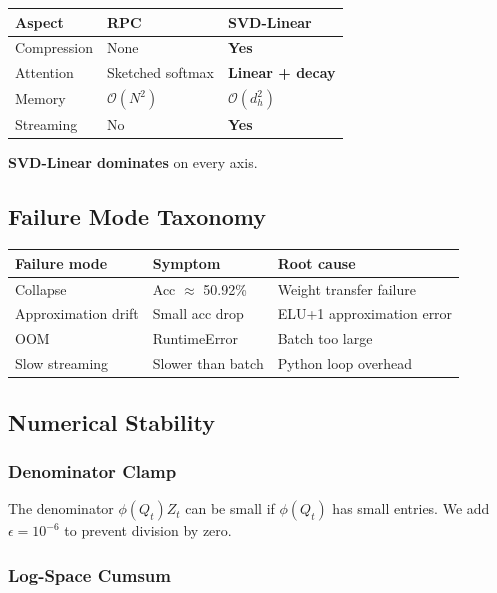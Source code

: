 \begin{table}[H]
\centering
\small
\begin{tabular}{lll}
\toprule
\textbf{Aspect} & \textbf{RPC} & \textbf{SVD-Linear} \\
\midrule
Compression & None & \textbf{Yes} \\
Attention & Sketched softmax & \textbf{Linear + decay} \\
Memory & $\mathcal{O}(N^2)$ & \textbf{$\mathcal{O}(d_h^2)$} \\
Streaming & No & \textbf{Yes} \\
\bottomrule
\end{tabular}
\end{table}

\textbf{SVD-Linear dominates} on every axis.

\subsection{Failure Mode Taxonomy}

\begin{table}[H]
\centering
\small
\begin{tabular}{lll}
\toprule
\textbf{Failure mode} & \textbf{Symptom} & \textbf{Root cause} \\
\midrule
Collapse & Acc $\approx$ 50.92\% & Weight transfer failure \\
Approximation drift & Small acc drop & ELU+1 approximation error \\
OOM & RuntimeError & Batch too large \\
Slow streaming & Slower than batch & Python loop overhead \\
\bottomrule
\end{tabular}
\end{table}

\subsection{Numerical Stability}

\subsubsection{Denominator Clamp}

The denominator $\phi(Q_t) Z_t$ can be small if $\phi(Q_t)$ has small 
entries. We add $\epsilon = 10^{-6}$ to prevent division by zero.

\subsubsection{Log-Space Cumsum}

